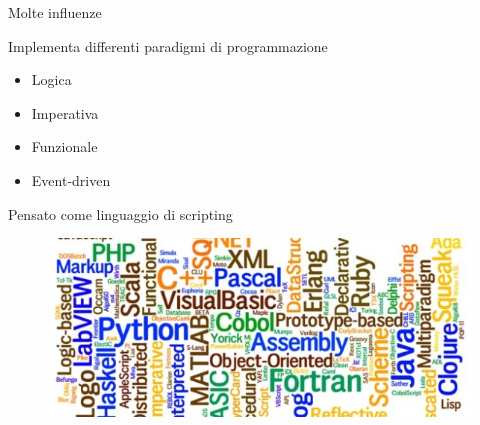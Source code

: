 \begin{frame}{Molte influenze}

	Implementa differenti paradigmi di programmazione
	\begin{itemize}
		\item Logica
		\item Imperativa
		\item Funzionale
		\item Event-driven
	\end{itemize}

	\vspace{1em}
	Pensato come linguaggio di scripting

	\begin{figure}
		\centering
		\includegraphics[scale=0.35]{res/influenze}
	\end{figure}
\end{frame}